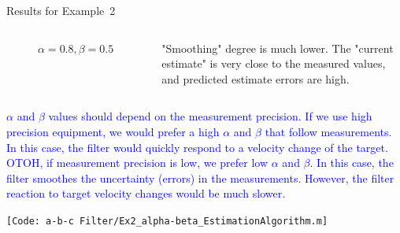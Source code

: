 \begin{frame}{Results for Example~2}
\begin{columns}
\begin{figure}
	    \label{fig:ex2_estimationAlgorithm_alpha0.8_beta0.5}
	    \vspace{-15pt}
	    \caption{$\alpha=0.8, \beta=0.5$}
	    \vspace{-8pt}
	\end{figure}
	"Smoothing" degree is much lower. The "current estimate" is very close to the measured values, and predicted estimate errors are high.
\end{columns}
\vspace{7pt}
\textcolor{blue}{$\alpha$ and $\beta$ values should depend on the measurement precision. If we use high precision equipment, we would prefer a high $\alpha$ and $\beta$ that follow measurements. In this case, the filter would quickly respond to a velocity change of the target. OTOH, if measurement precision is low, we prefer low  $\alpha$ and $\beta$. In this case, the filter smoothes the uncertainty (errors) in the measurements. However, the filter reaction to target velocity changes would be much slower.}

\texttt{\tiny [Code: a-b-c Filter/Ex2\_alpha-beta\_EstimationAlgorithm.m]}
\end{frame}
